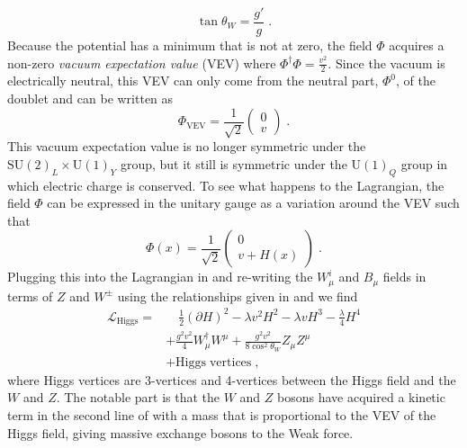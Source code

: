 \begin{equation}
    \tan \theta_W = \frac{g'}{g}\;.\label{eq:weinberg-angle}
\end{equation}
Because the potential has a minimum that is not at zero, the field $\Phi$ acquires a non-zero \emph{vacuum expectation value} (VEV) where $\Phi^\dag \Phi = \frac{v^2}{2}$. Since the vacuum is electrically neutral, this VEV can only come from the neutral part, $\Phi^0$, of the doublet and can be written as
\begin{equation}
    \Phi_\mathrm{VEV} = \frac{1}{\sqrt{2}}\begin{pmatrix}
        0\\
        v
    \end{pmatrix}\;.
\end{equation}
This vacuum expectation value is no longer symmetric under the $\mathrm{SU}(2)_L \times \mathrm{U}(1)_Y$ group, but it still is symmetric under the $\mathrm{U}(1)_Q$ group in which electric charge is conserved. To see what happens to the Lagrangian, the field $\Phi$ can be expressed in the unitary gauge as a variation around the VEV such that
\begin{equation}
    \Phi(x) = \frac{1}{\sqrt{2}}\begin{pmatrix}
        0 \\
        v + H(x)
    \end{pmatrix}\;.
\end{equation}
Plugging this into the Lagrangian in  and re-writing the $W_\mu^i$ and $B_\mu$ fields in terms of $Z$ and $W^\pm$ using the relationships given in  and  we find
\begin{equation}
\begin{aligned}
    \mathcal{L}_\mathrm{Higgs} = &\hspace{1em}\frac{1}{2}(\partial H)^2 - \lambda v^2 H^2 - \lambda v H^3 - \frac{\lambda}{4}H^4 \\
    &+ \frac{g^2v^2}{4} W_\mu^\dag W^\mu + \frac{g^2 v^2}{8\cos^2\theta_W}Z_\mu Z^\mu \\
    &+ \mathrm{Higgs\;vertices}\;,
    \label{eq:boson-mass-terms}
\end{aligned}
\end{equation}
where Higgs vertices are 3-vertices and 4-vertices between the Higgs field and the $W$ and $Z$. The notable part is that the $W$ and $Z$ bosons have acquired a kinetic term in the second line of  with a mass that is proportional to the VEV of the Higgs field, giving massive exchange bosons to the Weak force.

